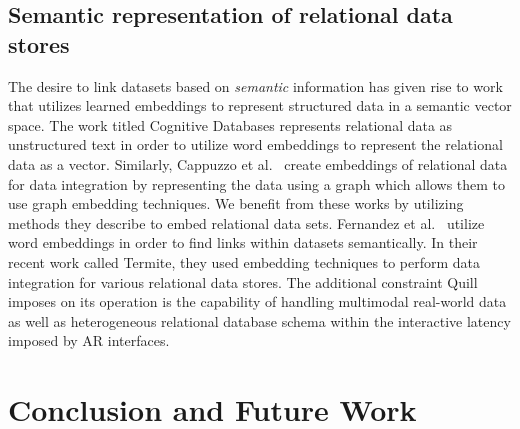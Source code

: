 \documentclass[11pt]{article}
\begin{document}
\subsection{Semantic representation of relational data stores} The desire to link datasets based on \emph{semantic} information has given rise to work that utilizes learned embeddings to represent structured data in a semantic vector space.
The work titled Cognitive Databases \cite{bordawekar2017cognitive} represents relational data as unstructured text in order to utilize word embeddings to represent the relational data as a vector.
Similarly, Cappuzzo et al.~\cite{cappuzzo2020creating} create embeddings of relational data for data integration by representing the data using a graph which allows them to use graph embedding techniques.
We benefit from these works by utilizing methods they describe to embed relational data sets.
Fernandez et al.~\cite{fernandez2018seeping} utilize word embeddings in order to find links within datasets semantically. In their recent work \cite{fernandez2019termite} called Termite, they used embedding techniques to perform data integration for various relational data stores.
The additional constraint Quill imposes on its operation is the capability of handling multimodal real-world data as well as heterogeneous relational database schema within the interactive latency imposed by AR interfaces.

\section{Conclusion and Future Work}
\end{document}
